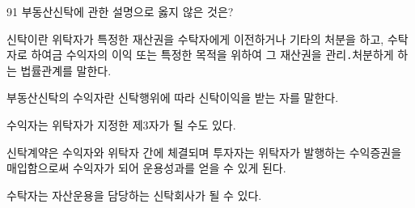 \begin{question}{91}
부동산신탁에 관한 설명으로 옳지 않은 것은?
\begin{choices}
  \item 신탁이란 위탁자가 특정한 재산권을 수탁자에게 이전하거나 기타의 처분을 하고, 수탁자로 하여금 수익자의 이익 또는 특정한 목적을 위하여 그 재산권을 관리․처분하게 하는 법률관계를 말한다.
  \item 부동산신탁의 수익자란 신탁행위에 따라 신탁이익을 받는 자를 말한다.
  \item 수익자는 위탁자가 지정한 제3자가 될 수도 있다.
  \item 신탁계약은 수익자와 위탁자 간에 체결되며 투자자는 위탁자가 발행하는 수익증권을 매입함으로써 수익자가 되어 운용성과를 얻을 수 있게 된다.
  \item 수탁자는 자산운용을 담당하는 신탁회사가 될 수 있다.
\end{choices}
\end{question}
